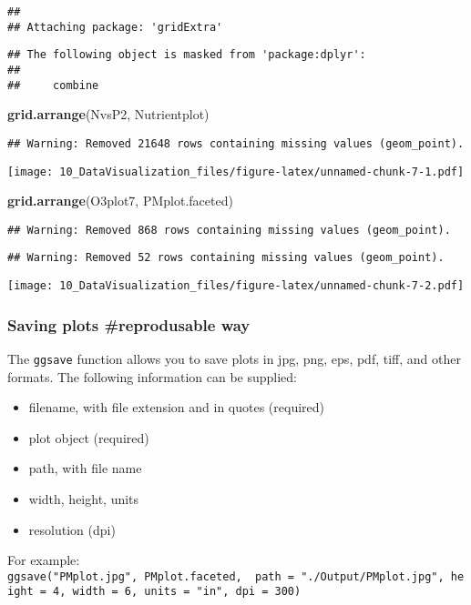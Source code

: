 \documentclass[]{article}
\newenvironment{Shaded}{\begin{snugshade}}{\end{snugshade}}
\newcommand{\KeywordTok}[1]{\textcolor[rgb]{0.13,0.29,0.53}{\textbf{#1}}}
\newcommand{\NormalTok}[1]{#1}
\providecommand{\tightlist}{%
  \setlength{\itemsep}{0pt}\setlength{\parskip}{0pt}}
\begin{document}
\begin{verbatim}
## 
## Attaching package: 'gridExtra'
\end{verbatim}

\begin{verbatim}
## The following object is masked from 'package:dplyr':
## 
##     combine
\end{verbatim}

\begin{Shaded}
\begin{Highlighting}[]
\KeywordTok{grid.arrange}\NormalTok{(NvsP2, Nutrientplot)}
\end{Highlighting}
\end{Shaded}

\begin{verbatim}
## Warning: Removed 21648 rows containing missing values (geom_point).
\end{verbatim}

\texttt{[image: 10\_DataVisualization\_files/figure-latex/unnamed-chunk-7-1.pdf]}

\begin{Shaded}
\begin{Highlighting}[]
\KeywordTok{grid.arrange}\NormalTok{(O3plot7, PMplot.faceted)}
\end{Highlighting}
\end{Shaded}

\begin{verbatim}
## Warning: Removed 868 rows containing missing values (geom_point).
\end{verbatim}

\begin{verbatim}
## Warning: Removed 52 rows containing missing values (geom_point).
\end{verbatim}

\texttt{[image: 10\_DataVisualization\_files/figure-latex/unnamed-chunk-7-2.pdf]}

\subsubsection{Saving plots \#reprodusable
way}\label{saving-plots-reprodusable-way}

The \texttt{ggsave} function allows you to save plots in jpg, png, eps,
pdf, tiff, and other formats. The following information can be supplied:

\begin{itemize}
\tightlist
\item
  filename, with file extension and in quotes (required)
\item
  plot object (required)
\item
  path, with file name
\item
  width, height, units
\item
  resolution (dpi)
\end{itemize}

For example:
\texttt{ggsave("PMplot.jpg",\ PMplot.faceted,\ \ path\ =\ "./Output/PMplot.jpg",\ height\ =\ 4,\ width\ =\ 6,\ units\ =\ "in",\ dpi\ =\ 300)}
\end{document}
